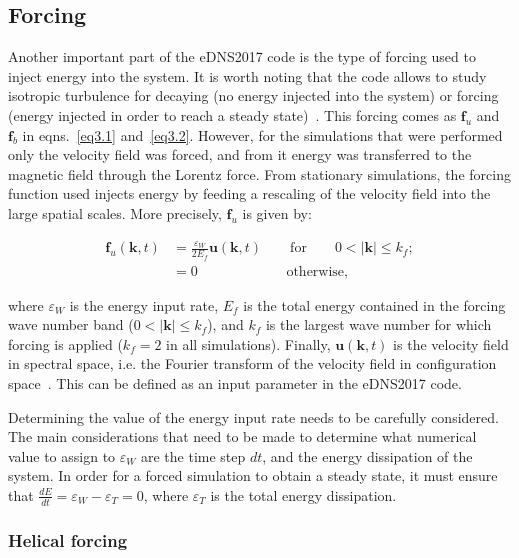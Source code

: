 \documentclass[12pt,a4paper]{report}
\begin{document}
\subsection{Forcing}

Another important part of the eDNS2017 code is the type of forcing used to inject energy into the system. It is worth noting that the code allows to study isotropic turbulence for decaying (no energy injected into the system) or forcing (energy injected in order to reach a steady state)~\cite{LinkmannMoritzFrederikLeon2016Spim}. This forcing comes as $\bm f_u$ and $\bm f_b$ in eqns.~\ref{eq3.1} and~\ref{eq3.2}. However, for the simulations that were performed only the velocity field was forced, and from it energy was transferred to the magnetic field through the Lorentz force. From stationary simulations, the forcing function used injects energy by feeding a rescaling of the velocity field into the large spatial scales. More precisely, $\bm f_u$ is given by:

\begin{align}
 \bm f_u(\bm k, t) &= \frac{\varepsilon_W}{2 E_f} \bm u(\bm k, t) \qquad \text{for} \qquad 0 < \vert \bm k \vert \leq k_f; \nonumber \\
 &= 0 \,\, \qquad \qquad \qquad \text{otherwise,} \nonumber
\end{align}

where $\varepsilon_W$ is the energy input rate, $E_f$ is the total energy contained in the forcing wave number band ($0 < \vert \bm k \vert \leq k_f$), and $k_f$ is the largest wave number for which forcing is applied ($k_f=2$ in all simulations). Finally, $\bm u(\bm k, t)$ is the velocity field in spectral space, i.e. the Fourier transform of the velocity field in configuration space~\cite{LinkmannMoritzFrederikLeon2016Spim}. This can be defined as an input parameter in the eDNS2017 code. 

Determining the value of the energy input rate needs to be carefully considered. The main considerations that need to be made to determine what numerical value to assign to $\varepsilon_W$ are the time step $dt$, and the energy dissipation of the system. In order for a forced simulation to obtain a steady state, it must ensure that $\frac{dE}{dt}=\varepsilon_W - \varepsilon_T = 0$, where $\varepsilon_T$ is the total energy dissipation.

\subsubsection{Helical forcing}
\end{document}
